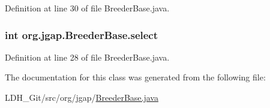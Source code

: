 Definition at line 30 of file Breeder\-Base.\-java.

\hypertarget{classorg_1_1jgap_1_1_breeder_base_aabb0562c937ba7fee15a5760e83eafa5}{
\subsubsection[{select}]{\setlength{\rightskip}{0pt plus 5cm}int org.\-jgap.\-Breeder\-Base.\-select}}\label{classorg_1_1jgap_1_1_breeder_base_aabb0562c937ba7fee15a5760e83eafa5}


Definition at line 28 of file Breeder\-Base.\-java.



The documentation for this class was generated from the following file\-:\begin{DoxyCompactItemize}
\item 
L\-D\-H\-\_\-\-Git/src/org/jgap/\hyperlink{_breeder_base_8java}{Breeder\-Base.\-java}\end{DoxyCompactItemize}
